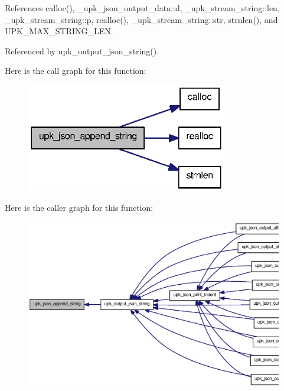 References calloc(), \_\-upk\_\-json\_\-output\_\-data::d, \_\-upk\_\-stream\_\-string::len, \_\-upk\_\-stream\_\-string::p, realloc(), \_\-upk\_\-stream\_\-string::str, strnlen(), and UPK\_\-MAX\_\-STRING\_\-LEN.



Referenced by upk\_\-output\_\-json\_\-string().



Here is the call graph for this function:
\nopagebreak
\begin{figure}[H]
\begin{center}
\leavevmode
\includegraphics[width=248pt]{upk__json_8c_a6da16344cd521702f884eaa92f5dfdbf_cgraph}
\end{center}
\end{figure}




Here is the caller graph for this function:
\nopagebreak
\begin{figure}[H]
\begin{center}
\leavevmode
\includegraphics[width=400pt]{upk__json_8c_a6da16344cd521702f884eaa92f5dfdbf_icgraph}
\end{center}
\end{figure}


